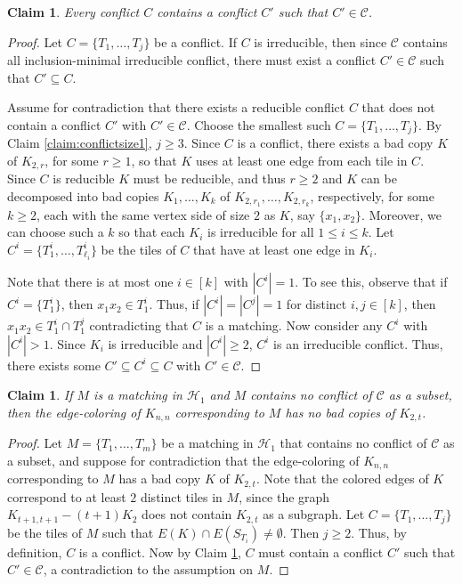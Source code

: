 \documentclass{article}
\newtheorem{claim}[theorem]{Claim}
\theoremstyle{definition}
\newcommand\cH{{\mathcal H}}
\newcommand\cC{{\mathcal C}}
\begin{document}
\begin{claim}\label{claim:confcontainirr}
    Every conflict $C$ contains a conflict $C'$ such that $C'\in \cC$.
\end{claim}
\begin{proof}
Let $C=\{T_1,\dots, T_j\}$ be a conflict.  
If $C$ is irreducible, then since $\mathcal{C}$ contains all inclusion-minimal irreducible conflict, there must exist a conflict $C'\in \mathcal{C}$ such that $C'\subseteq C$. 

Assume for contradiction that there exists a reducible conflict $C$ that does not contain a conflict $C'$ with $C'\in \mathcal{C}$. Choose the smallest such $C=\{T_1,\dots, T_j\}$. By Claim \ref{claim:conflictsize1}, $j\ge 3$. Since $C$ is a conflict, there exists a bad copy $K$ of $K_{2,r}$, for some $r\geq 1$, so that $K$ uses at least one edge from each tile in $C$. Since $C$ is reducible $K$ must be  reducible,  and thus  $r\ge 2$ and  $K$ can be decomposed into bad copies $K_1,\dots ,K_k$ of $K_{2,r_1}, \dots,K_{2,r_k}$, respectively, for some $k\geq 2$, each with the same vertex side of size $2$ as $K$, say $\{x_1,x_2\}$. Moreover, we can choose such a $k$ so that each $K_i$ is irreducible for all $1\le i\le k$. Let $C^i=\{T_1^i,\dots,T_{\ell_i}^i\}$ be the tiles of $C$ that have at least one edge in $K_i$. 

Note that there is at most one $i\in [k]$ with $|C^i|=1$. To see this, observe that if $C^i=\{T^i_1\}$, then $x_1x_2\in T^i_1$. Thus, if $|C^i|=|C^j|=1$ for distinct $i,j\in [k]$, then $x_1x_2\in T^i_1\cap T^j_1$ contradicting that $C$ is a matching. Now consider any $C^i$ with $|C^i|>1$. Since $K_i$ is irreducible and $|C^i|\geq 2$, $C^i$ is an irreducible conflict. Thus, there exists some $C'\subseteq C^i\subseteq C$ with $C'\in \mathcal{C}$. 
\end{proof}


\begin{claim}\label{claim: matching H1 is a good coloring}
If $M$ is a matching in $\cH_1$ and $M$ contains no conflict of $\cC$ as a subset, then the edge-coloring of $K_{n,n}$ corresponding to $M$ has no bad copies of $K_{2,t}$. 
\end{claim}
\begin{proof}
Let $M = \{T_1,\dots,T_m\}$ be a matching in $\mathcal{H}_1$ that contains no conflict of $\mathcal{C}$ as a subset, and suppose for contradiction that the edge-coloring of $K_{n,n}$ corresponding to $M$ has a bad copy $K$ of $K_{2,t}$. 
Note that the colored edges of $K$ correspond to at least $2$ distinct tiles in $M$, since the graph $K_{t+1,t+1}-(t+1)K_2$ does not contain $K_{2,t}$ as a subgraph.  Let  $C=\{T_1,\dots,T_j\}$ be the tiles of $M$ such that $E(K)\cap E(S_{T_i}) \neq \emptyset$. Then
$j\geq 2$. Thus, by definition, $C$ is a conflict. Now by Claim \ref{claim:confcontainirr}, $C$ must contain a conflict $C'$ such that $C'\in \mathcal{C}$, a contradiction to the assumption on $M$.
\end{proof}
\end{document}
